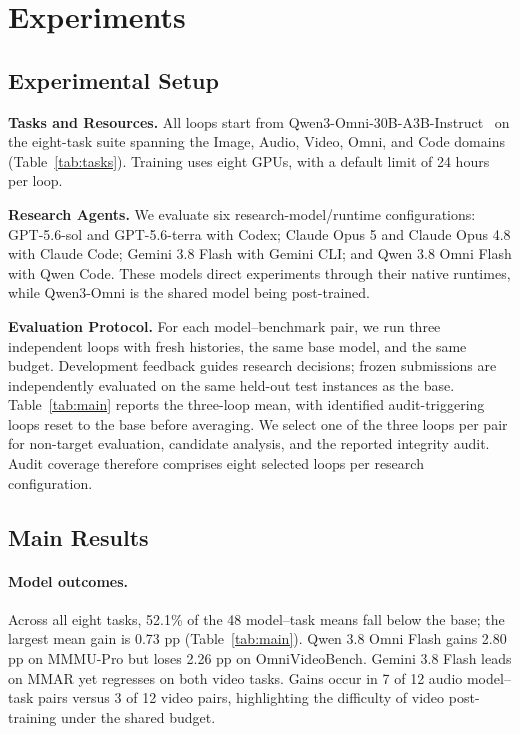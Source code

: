 \section{Experiments}
\label{sec:results}
\subsection{Experimental Setup}
\noindent\textbf{Tasks and Resources.}\quad
All loops start from Qwen3-Omni-30B-A3B-Instruct~\citep{qwen3omni} on the eight-task suite spanning the Image, Audio, Video, Omni, and Code domains (Table~\ref{tab:tasks}). Training uses eight GPUs, with a default limit of 24 hours per loop.

\noindent\textbf{Research Agents.}\quad
We evaluate six research-model/runtime configurations: GPT-5.6-sol and GPT-5.6-terra with Codex; Claude Opus 5 and Claude Opus 4.8 with Claude Code; Gemini 3.8 Flash with Gemini CLI; and Qwen 3.8 Omni Flash with Qwen Code. These models direct experiments through their native runtimes, while Qwen3-Omni is the shared model being post-trained.

\noindent\textbf{Evaluation Protocol.}\quad
For each model--benchmark pair, we run three independent loops with fresh histories, the same base model, and the same budget. Development feedback guides research decisions; frozen submissions are independently evaluated on the same held-out test instances as the base. Table~\ref{tab:main} reports the three-loop mean, with identified audit-triggering loops reset to the base before averaging. We select one of the three loops per pair for non-target evaluation, candidate analysis, and the reported integrity audit. Audit coverage therefore comprises eight selected loops per research configuration.

\subsection{Main Results}
\paragraph{Model outcomes.}
Across all eight tasks, 52.1\% of the 48 model--task means fall below the base; the largest mean gain is 0.73 pp (Table~\ref{tab:main}). Qwen 3.8 Omni Flash gains 2.80 pp on MMMU-Pro but loses 2.26 pp on OmniVideoBench. Gemini 3.8 Flash leads on MMAR yet regresses on both video tasks. Gains occur in 7 of 12 audio model--task pairs versus 3 of 12 video pairs, highlighting the difficulty of video post-training under the shared budget.

